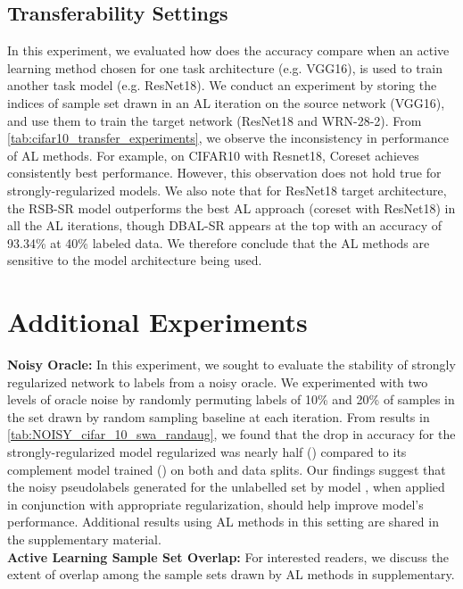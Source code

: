\documentclass[10pt,twocolumn,letterpaper]{article}
\begin{document}
\label{subsection:transfer_settings}
\subsection{Transferability Settings}
In this experiment, we evaluated how does the accuracy compare when an active learning method chosen for one task architecture (e.g. VGG16), is used to train another task model (e.g. ResNet18). We conduct an experiment by storing the indices of sample set drawn in an AL iteration on the source network (VGG16), and use them to train the target network (ResNet18 and WRN-28-2). From \cref{tab:cifar10_transfer_experiments}, we observe the inconsistency in performance of AL methods. For example, 
on CIFAR10 with Resnet18, Coreset achieves consistently best performance. However, this observation does not hold true for strongly-regularized models. We also note that for ResNet18 target architecture, the RSB-SR model outperforms the best AL approach (coreset with ResNet18) in all the AL iterations, though DBAL-SR appears at the top with an accuracy of 93.34\% at 40\% labeled data. We therefore conclude that the AL methods are sensitive to the model architecture being used.

\section{Additional Experiments}

\label{noisyoracle}
\noindent \textbf{Noisy Oracle:} In this experiment, we sought to evaluate the stability of strongly regularized network to labels from a noisy oracle. We experimented with two levels of oracle noise by randomly permuting labels of 10\% and 20\% of samples in the set drawn by random sampling baseline at each iteration.
From results in \cref{tab:NOISY_cifar_10_swa_randaug}, we found that the drop in accuracy for the strongly-regularized model regularized was nearly half () compared to its complement model trained 
() on both  and  data splits. Our findings suggest that the noisy pseudolabels generated for the unlabelled set  by model , when applied in conjunction with appropriate regularization, should help improve model's performance. Additional results using AL methods in this setting are shared in the supplementary material.\\

\noindent \textbf{Active Learning Sample Set Overlap:} For interested readers, we discuss the extent of overlap among the sample sets drawn by AL methods in supplementary. \\
\end{document}
